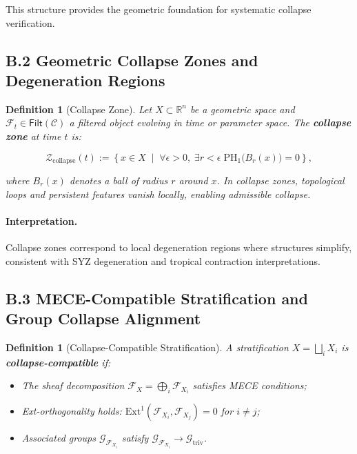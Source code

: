 \documentclass[11pt]{article}
\newtheorem{definition}[theorem]{Definition}
\begin{document}
This structure provides the geometric foundation for systematic collapse verification.

\subsection*{B.2 Geometric Collapse Zones and Degeneration Regions}

\begin{definition}[Collapse Zone]
Let \( X \subset \mathbb{R}^n \) be a geometric space and \( \mathcal{F}_t \in \mathsf{Filt}(\mathcal{C}) \) a filtered object evolving in time or parameter space. The \textbf{collapse zone} at time \( t \) is:

\[
\mathcal{Z}_{\mathrm{collapse}}(t) := \left\{ x \in X \;\middle|\; \forall \epsilon > 0, \; \exists r < \epsilon \; \mathrm{PH}_1\big(B_r(x)\big) = 0 \right\},
\]

where \( B_r(x) \) denotes a ball of radius \( r \) around \( x \). In collapse zones, topological loops and persistent features vanish locally, enabling admissible collapse.

\end{definition}

\paragraph{Interpretation.}
Collapse zones correspond to local degeneration regions where structures simplify, consistent with SYZ degeneration and tropical contraction interpretations.

\subsection*{B.3 MECE-Compatible Stratification and Group Collapse Alignment}

\begin{definition}[Collapse-Compatible Stratification]
A stratification \( X = \bigsqcup_i X_i \) is \textbf{collapse-compatible} if:

\begin{itemize}
    \item The sheaf decomposition \( \mathcal{F}_X = \bigoplus_i \mathcal{F}_{X_i} \) satisfies MECE conditions;
    \item Ext-orthogonality holds: \( \mathrm{Ext}^1(\mathcal{F}_{X_i}, \mathcal{F}_{X_j}) = 0 \) for \( i \neq j \);
    \item Associated groups \( \mathcal{G}_{\mathcal{F}_{X_i}} \) satisfy \( \mathcal{G}_{\mathcal{F}_{X_i}} \longrightarrow \mathcal{G}_{\mathrm{triv}} \).
\end{itemize}
\end{definition}
\end{document}
